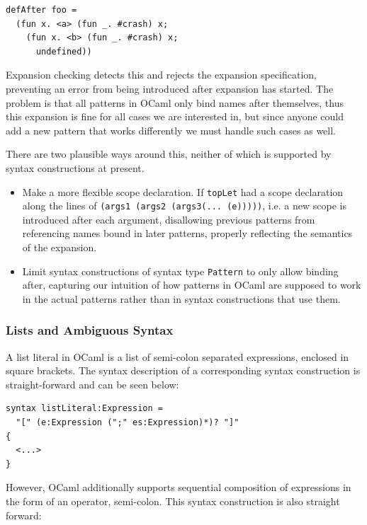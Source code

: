 \documentclass{kththesis}
\begin{document}
\begin{verbatim}
defAfter foo =
  (fun x. <a> (fun _. #crash) x;
    (fun x. <b> (fun _. #crash) x;
      undefined))
\end{verbatim}

Expansion checking detects this and rejects the expansion specification, preventing an error from being introduced after expansion has started. The problem is that all patterns in OCaml only bind names after themselves, thus this expansion is fine for all cases we are interested in, but since anyone could add a new pattern that works differently we must handle such cases as well.

There are two plausible ways around this, neither of which is supported by syntax constructions at present.
\begin{itemize}
  \item Make a more flexible scope declaration. If \texttt{topLet} had a scope declaration along the lines of \texttt{(args1 (args2 (args3(... (e)))))}, i.e. a new scope is introduced after each argument, disallowing previous patterns from referencing names bound in later patterns, properly reflecting the semantics of the expansion.

  \item Limit syntax constructions of syntax type \texttt{Pattern} to only allow binding after, capturing our intuition of how patterns in OCaml are supposed to work in the actual patterns rather than in syntax constructions that use them.
\end{itemize}

\subsubsection{Lists and Ambiguous Syntax} \label{sec:ambiguous-lists}

A list literal in OCaml is a list of semi-colon separated expressions, enclosed in square brackets. The syntax description of a corresponding syntax construction is straight-forward and can be seen below:

\begin{verbatim}
syntax listLiteral:Expression =
  "[" (e:Expression (";" es:Expression)*)? "]"
{
  <...>
}
\end{verbatim}

However, OCaml additionally supports sequential composition of expressions in the form of an operator, semi-colon. This syntax construction is also straight forward:
\end{document}
